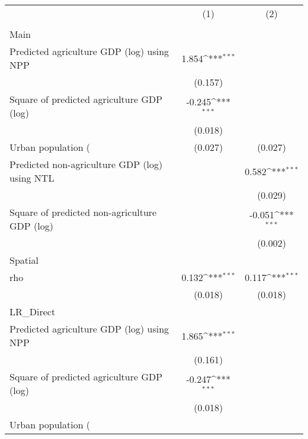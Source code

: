 {
\def\sym#1{\ifmmode^{#1}\else\(^{#1}\)\fi}
\begin{tabular}{l*{2}{c}}
\hline\hline
                    &\multicolumn{1}{c}{(1)}&\multicolumn{1}{c}{(2)}\\
                    &\multicolumn{1}{c}{ }&\multicolumn{1}{c}{ }\\
\hline
Main                &                     &                     \\
Predicted agriculture GDP (log) using NPP&       1.854\sym{***}&                     \\
                    &     (0.157)         &                     \\
[1em]
Square of predicted agriculture GDP (log)&      -0.245\sym{***}&                     \\
                    &     (0.018)         &                     \\
[1em]
Urban population (%
                    &     (0.027)         &     (0.027)         \\
[1em]
Predicted non-agriculture GDP (log) using NTL&                     &       0.582\sym{***}\\
                    &                     &     (0.029)         \\
[1em]
Square of predicted non-agriculture GDP (log)&                     &      -0.051\sym{***}\\
                    &                     &     (0.002)         \\
\hline
Spatial             &                     &                     \\
rho                 &       0.132\sym{***}&       0.117\sym{***}\\
                    &     (0.018)         &     (0.018)         \\
\hline
LR\_Direct           &                     &                     \\
Predicted agriculture GDP (log) using NPP&       1.865\sym{***}&                     \\
                    &     (0.161)         &                     \\
[1em]
Square of predicted agriculture GDP (log)&      -0.247\sym{***}&                     \\
                    &     (0.018)         &                     \\
[1em]
Urban population (%

\end{tabular}}
